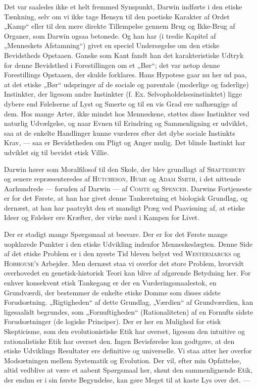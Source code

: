 \documentclass[12pt,a4paper,openany]{book}
\newcommand{\opage}[1]{\marginnote{\footnotesize\textit{[#1]}}}
\begin{document}
Det var saaledes ikke et helt fremmed Synspunkt, Darwin
indførte i den etiske Tænkning, selv om vi ikke tage Hensyn
til den poetiske Karakter af Ordet „Kamp“ eller til den mere
direkte Tillempelse gennem Brug og Ikke-Brug af Organer,
som Darwin ogsaa betonede. Og han har (i tredie Kapitel af
„Menneskets Afstamning“) givet en speciel Undersøgelse om
den etiske Bevidstheds Opstaaen. Ganske som Kant fandt han
det karakteristiske Udtryk for denne Bevidsthed i Forestillingen
om et „Bør“; det var netop denne Forestillings Opstaaen, der
skulde forklares. Hans Hypotese gaar nu her ud paa, at det
etiske „Bør“ udspringer af de sociale og parentale (moderlige
og faderlige) Instinkter, der ligesom andre Instinkter (f. Ex.
\setcounter{footnote}{0}%
\opage{222}Selvopholdelsesinstinktet) ligge dybere end Følelserne af Lyst
og Smerte og til en vis Grad ere uafhængige af dem. Hos
mange Arter, ikke mindst hos Menneskene, støttes disse Instinkter
ved naturlig Udvælgelse, og naar Evnen til Erindring
og Sammenligning er udviklet, saa at de enkelte Handlinger
kunne vurderes efter det dybe sociale Instinkts Krav, --- saa
er Bevidstheden om Pligt og Anger mulig. Det blinde Instinkt
har udviklet sig til bevidst etisk Villie.

Darwin hører som Moralfilosof til den Skole, der blev
grundlagt af \textsc{Shaftesbury} og senere repræsenteredes af \textsc{Hutcheson},
\textsc{Hume} og \textsc{Adam Smith}, i det nittende Aarhundrede
--- foruden af Darwin --- af \textsc{Comte} og \textsc{Spencer}. Darwins
Fortjeneste er for det Første, at han har givet denne Tankeretning
et biologisk Grundlag, og dernæst, at han har paatrykt
den et mandigt Præg ved Paavisning af, at etiske Ideer og
Følelser ere Kræfter, der virke med i Kampen for Livet.

Der er stadigt mange Spørgsmaal at besvare. Der er for
det Første mange uopklarede Punkter i den etiske Udvikling
indenfor Menneskeslægten. Denne Side af det etiske Problem
er i den nyeste Tid bleven belyst ved \textsc{Westermarcks} og
\textsc{Hobhouse’s} Arbejder. Men dernæst staa vi overfor det store
Problem, hvorvidt overhovedet en genetisk-historisk Teori kan
blive af afgørende Betydning her. For enhver konsekvent etisk
Tankegang er der en Vurderingsmaalestok, en Grundværdi, der
bestemmer de enkelte etiske Domme som disses sidste Forudsætning.
„Rigtigheden“ af dette Grundlag, „Værdien“ af Grundværdien,
kan ligesaalidt begrundes, som „Fornuftigheden“ (Rationaliteten)
af en Fornufts sidste Forudsætninger (de logiske
Principer). Der er her en Mulighed for etisk Skepticisme, som
den evolutionistiske Etik har overset, ligesom den intuitive og
rationalistiske Etik har overset den. Ingen Bevisførelse kan
godtgøre, at den etiske Udviklings Resultater ere definitive og
universelle. Vi staa atter her overfor Modsætningen mellem
Systematik og Evolution. Der vil, efter min Opfattelse, altid
vedblive at være et aabent Spørgsmaal her, skønt den sammenlignende
Etik, der endnu er i sin første Begyndelse, kan
gøre Meget til at kaste Lys over det. ---
\end{document}
